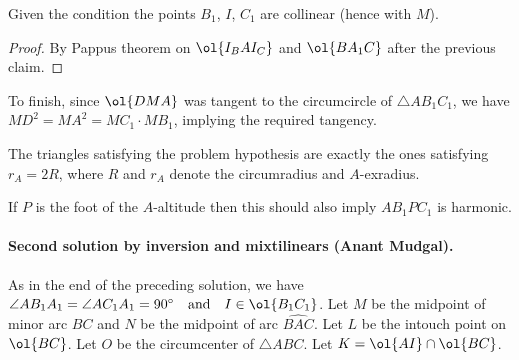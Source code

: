 \begin{claim*}
  Given the condition the points $B_1$, $I$, $C_1$ are collinear
  (hence with $M$).
\end{claim*}
\begin{proof}
  By Pappus theorem on $\ol{I_B A I_C}$ and $\ol{BA_1C}$
  after the previous claim.
\end{proof}

To finish, since $\ol{DMA}$ was tangent to the circumcircle of
$\triangle AB_1C_1$, we have $MD^2 = MA^2 = MC_1 \cdot MB_1$,
implying the required tangency.


\begin{remark*}
The triangles satisfying the problem hypothesis
are exactly the ones satisfying $r_A = 2R$,
where $R$ and $r_A$ denote the circumradius and $A$-exradius.
\end{remark*}

\begin{remark*}
  If $P$ is the foot of the $A$-altitude
  then this should also imply $AB_1PC_1$ is harmonic.
\end{remark*}

\paragraph{Second solution by inversion and mixtilinears (Anant Mudgal).}
As in the end of the preceding solution, we have
$\angle AB_1A_1=\angle AC_1A_1=90^{\circ}
\quad\text{and}\quad I \in \ol{B_1 C_1}$.
Let $M$ be the midpoint of minor arc $BC$
and $N$ be the midpoint of arc $\widehat{BAC}$.
Let $L$ be the intouch point on $\ol{BC}$.
Let $O$ be the circumcenter of $\triangle ABC$.
Let $K=\ol{AI} \cap \ol{BC}$.

